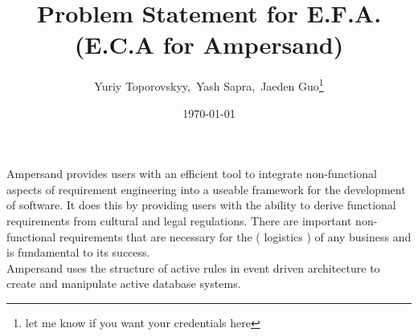 \documentclass[12pt]{article}
\begin{document}
\title{Problem Statement for E.F.A. (E.C.A for Ampersand)} 
\author{Yuriy Toporovskyy,\ Yash Sapra,\ Jaeden Guo\footnote{let me 
know if you want your credentials here}}
\date{\today}
	
\maketitle

\indent Ampersand provides users with an efficient tool to integrate 
non-functional aspects of requirement engineering into a useable framework for 
the development of software. It does this by providing users with the 
ability to derive functional requirements from cultural and legal 
regulations. There are important non-functional requirements that are necessary 
for the ( logistics ) of any business and is fundamental to its success. \\
\indent Ampersand uses the structure of active rules in event driven 
architecture to create and manipulate active database systems.
\\
\end{document}
